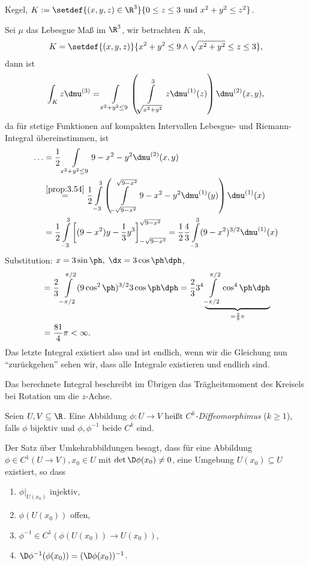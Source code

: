 \begin{bsp}
\label{bsp:3.55}
Kegel, $K:= \setdef{(x,y,z)\in\R^3}{0\le z\le 3\text{ und } x^2+y^2 \le z^2}$.

Sei $\mu$ das Lebesgue Maß im $\R^3$, wir betrachten $K$ als,
\begin{align*}
K = \setdef{(x,y,z)}{x^2+y^2\le 9\land \sqrt{x^2+y^2}\le z\le 3},
\end{align*}
dann ist
\begin{align*}
\int_K z\dmu^{(3)} = \int\limits_{x^2+y^2\le 9}
\left(\int\limits_{\sqrt{x^2+y^2}}^3 z\dmu^{(1)}(z) \right)\dmu^{(2)}(x,y),  
\end{align*}
da für stetige Funktionen auf kompakten Intervallen Lebesgue- und
Riemann-Integral übereinstimmen, ist
\begin{align*}
\ldots &= \frac{1}{2} \int\limits_{x^2+y^2\le 9} 9 - x^2-y^2 \dmu^{(2)}(x,y)
\\ &\overset{\ref{prop:3.54}}{=} \frac{1}{2} \int\limits_{-3}^3 \left( 
\int\limits_{-\sqrt{9-x^2}}^{\sqrt{9-x^2}} 9 - x^2-y^2 \dmu^{(1)}(y)
\right) \dmu^{(1)}(x)
\\ &= \frac{1}{2} \int\limits_{-3}^3
\left[(9-x^2)y-\frac{1}{3}y^3\right]_{-\sqrt{9-x^2}}^{\sqrt{9-x^2}}
= \frac{1}{2}\frac{4}{3} \int\limits_{-3}^3 (9-x^2)^{3/2} 
\dmu^{(1)}(x)
\end{align*}
Substitution: $x=3\sin \ph,\; \dx = 3\cos \ph\dph$,
\begin{align*}
&= \frac{2}{3} \int\limits_{-\pi/2}^{\pi/2} (9\cos^2 \ph)^{3/2} 3\cos\ph\dph
= \frac{2}{3} 3^4 \underbrace{\int\limits_{-\pi/2}^{\pi/2} \cos^4\ph
\dph}_{=\frac{3}{8}\pi}\\ &= \frac{81}{4}\pi <\infty.
\end{align*}
Das letzte Integral existiert also und ist endlich, wenn wir die Gleichung nun
``zurückgehen'' sehen wir, dass alle Integrale existieren und endlich sind.

Das berechnete Integral beschreibt im Übrigen das Trägheitsmoment des Kreisels
bei Rotation um die $z$-Achse.\bsphere
\end{bsp}

\begin{defn}
\label{defn:3.56}
Seien $U,V\subseteq\R$. Eine Abbildung $\phi: U\to V$ heißt
\emph{$C^k$-Diffeomorphimus} ($k\ge 1$), falls $\phi$ bijektiv und
$\phi,\phi^{-1}$ beide $C^k$ sind.\fishhere
\end{defn}

\begin{bem}
\label{bem:3.57}
Der Satz über Umkehrabbildungen besagt, dass für eine Abbildung $\phi\in
C^1(U\to V), x_0\in U$ mit $\det \D\phi(x_0) \neq 0$, eine Umgebung
$U(x_0)\subseteq U$ existiert, so dass
\begin{enumerate}[label=(\roman{*})]
  \item $\phi\big|_{U(x_0)}$ injektiv,
  \item $\phi(U(x_0))$ offen,
  \item $\phi^{-1}\in C^1(\phi(U(x_0))\to U(x_0))$,
  \item $\D\phi^{-1}(\phi(x_0)) =
(\D\phi(x_0))^{-1}$.\maphere
\end{enumerate}
\end{bem}


